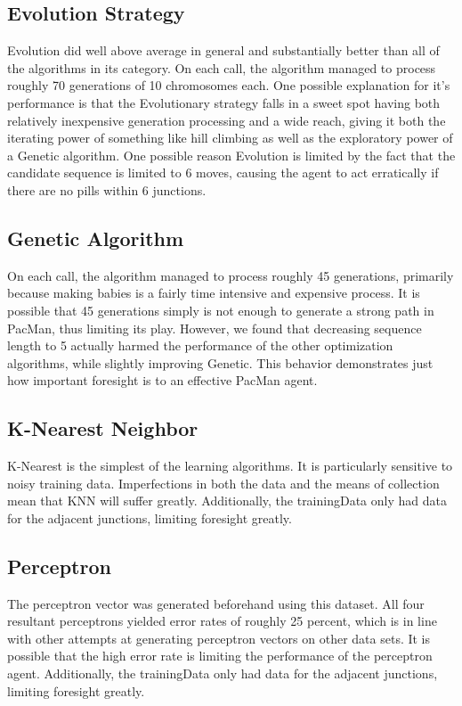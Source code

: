 \documentclass[a4paper]{article}
\begin{document}
\subsection{Evolution Strategy}
Evolution did well above average in general and substantially better than all of the algorithms in its category. On each call, the algorithm managed to process roughly 70 generations of 10 chromosomes each.  One possible explanation for it's performance is that the Evolutionary strategy falls in a sweet spot having both relatively inexpensive generation processing and a wide reach, giving it both the iterating power of something like hill climbing as well as the exploratory power of a Genetic algorithm.  One possible reason Evolution is limited by the fact that the candidate sequence is limited to 6 moves, causing the agent to act erratically if there are no pills within 6 junctions.

\subsection{Genetic Algorithm}
On each call, the algorithm managed to process roughly 45 generations, primarily because making babies is a fairly time intensive and expensive process.  It is possible that 45 generations simply is not enough to generate a strong path in PacMan, thus limiting its play.  However, we found that decreasing sequence length to 5 actually harmed the performance of the other optimization algorithms, while slightly improving Genetic.  This behavior demonstrates just how important foresight is to an effective PacMan agent.


\subsection{K-Nearest Neighbor}

K-Nearest is the simplest of the learning algorithms. It is particularly sensitive to noisy training data. Imperfections in both the data and the means of collection mean that KNN will suffer greatly. Additionally, the trainingData only had data for the adjacent junctions, limiting foresight greatly.

\subsection{Perceptron}

The perceptron vector was generated beforehand using this dataset.  All four resultant perceptrons yielded error rates of roughly 25 percent, which is in line with other attempts at generating perceptron vectors on other data sets.  It is possible that the high error rate is limiting the performance of the perceptron agent.  Additionally, the trainingData only had data for the adjacent junctions, limiting foresight greatly.
\end{document}
